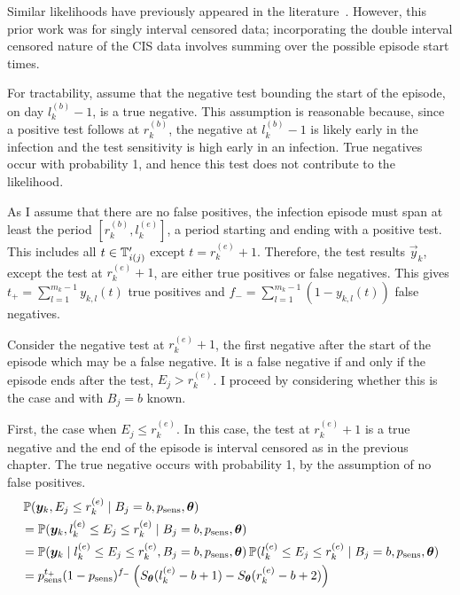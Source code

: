 \documentclass[thesis.tex]{subfiles}
\begin{document}
Similar likelihoods have previously appeared in the literature~\autocite[e.g.][eq.\ (2)]{piresIntervalMisclassify}.
However, this prior work was for singly interval censored data; incorporating the double interval censored nature of the CIS data involves summing over the possible episode start times.


For tractability, assume that the negative test bounding the start of the episode, on day $l_k^{(b)}-1$, is a true negative.
This assumption is reasonable because, since a positive test follows at $r_k^{(b)}$, the negative at $l_k^{(b)}-1$ is likely early in the infection and the test sensitivity is high early in an infection.
True negatives occur with probability 1, and hence this test does not contribute to the likelihood.

As I assume that there are no false positives, the infection episode must span at least the period $[r^{(b)}_k, l^{(e)}_k]$, a period starting and ending with a positive test.
This includes all $t \in \mathbb{T}'_{i(j)}$ except $t = r_k^{(e)}+1$.
Therefore, the test results $\vec{y}_k$, except the test at $r_k^{(e)}+1$, are either true positives or false negatives.
This gives $t_+ = \sum_{l=1}^{m_k-1} y_{k,l}(t)$ true positives and $f_- = \sum_{l=1}^{m_k-1} (1 - y_{k,l}(t))$ false negatives.

Consider the negative test at $r_k^{(e)}+1$, the first negative after the start of the episode which may be a false negative.
It is a false negative if and only if the episode ends after the test, \ie $E_j > r_k^{(e)}$.
I proceed by considering whether this is the case and with $B_j = b$ known.

First, the case when $E_j \leq r_k^{(e)}$.
In this case, the test at $r_k^{(e)}+1$ is a true negative and the end of the episode is interval censored as in the previous chapter.
The true negative occurs with probability 1, by the assumption of no false positives.
\begin{align}
&\prob(\vec{y}_k, E_j \leq r_k^{(e)} \mid B_j = b, p_\text{sens}, \vec{\theta}) \\
&= \prob(\vec{y}_k, l_k^{(e)} \leq E_j \leq r_k^{(e)} \mid B_j = b, p_\text{sens}, \vec{\theta}) \\ %
&= \prob(\vec{y}_k \mid l_k^{(e)} \leq E_j \leq r_k^{(e)}, B_j = b, p_\text{sens}, \vec{\theta}) \prob(l_k^{(e)} \leq E_j \leq r_k^{(e)} \mid B_j = b, p_\text{sens}, \vec{\theta}) \\
&= p_\text{sens}^{t_+} (1 - p_\text{sens})^{f_-} \left( S_{\vec{\theta}}(l_k^{(e)} - b + 1) - S_{\vec{\theta}}(r_k^{(e)} - b + 2) \right)
\label{imperf-test:eq:ll-ei-lt-ri}
\end{align}
\end{document}
